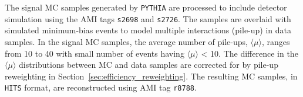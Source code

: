 
The signal MC samples generated by \texttt{PYTHIA} are processed to include detector simulation using the AMI tags \texttt{s2698} and \texttt{s2726}. The samples are overlaid with simulated minimum-bias events to model multiple interactions (pile-up) in data samples. In the signal MC samples, the average number of pile-ups, $\langle\mu\rangle$, ranges from 10 to 40 with small number of events having $\langle\mu\rangle$ < 10. The difference in the $\langle\mu\rangle$ distributions between MC and data samples are corrected for by pile-up reweighting in Section~\ref{sec:efficiency_reweighting}. The resulting MC samples, in \texttt{HITS} format, are reconstructed using AMI tag \texttt{r8788}.

